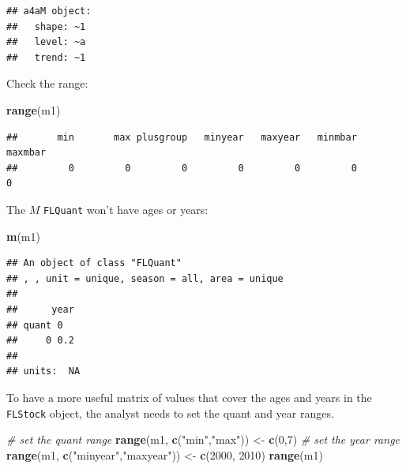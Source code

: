 \documentclass[
]{book}
\newenvironment{Shaded}{\begin{snugshade}}{\end{snugshade}}
\newcommand{\CommentTok}[1]{\textcolor[rgb]{0.56,0.35,0.01}{\textit{#1}}}
\newcommand{\DecValTok}[1]{\textcolor[rgb]{0.00,0.00,0.81}{#1}}
\newcommand{\FunctionTok}[1]{\textcolor[rgb]{0.13,0.29,0.53}{\textbf{#1}}}
\newcommand{\NormalTok}[1]{#1}
\newcommand{\OtherTok}[1]{\textcolor[rgb]{0.56,0.35,0.01}{#1}}
\newcommand{\StringTok}[1]{\textcolor[rgb]{0.31,0.60,0.02}{#1}}
\begin{document}
\begin{verbatim}
## a4aM object:
##   shape: ~1
##   level: ~a
##   trend: ~1
\end{verbatim}

Check the range:

\begin{Shaded}
\begin{Highlighting}[]
\FunctionTok{range}\NormalTok{(m1)}
\end{Highlighting}
\end{Shaded}

\begin{verbatim}
##       min       max plusgroup   minyear   maxyear   minmbar   maxmbar 
##         0         0         0         0         0         0         0
\end{verbatim}

The \(M\) \texttt{FLQuant} won't have ages or years:

\begin{Shaded}
\begin{Highlighting}[]
\FunctionTok{m}\NormalTok{(m1)}
\end{Highlighting}
\end{Shaded}

\begin{verbatim}
## An object of class "FLQuant"
## , , unit = unique, season = all, area = unique
## 
##      year
## quant 0  
##     0 0.2
## 
## units:  NA
\end{verbatim}

To have a more useful matrix of values that cover the ages and years in the \texttt{FLStock} object, the analyst needs to set the quant and year ranges.

\begin{Shaded}
\begin{Highlighting}[]
\CommentTok{\# set the quant range}
\FunctionTok{range}\NormalTok{(m1, }\FunctionTok{c}\NormalTok{(}\StringTok{"min"}\NormalTok{,}\StringTok{"max"}\NormalTok{)) }\OtherTok{\textless{}{-}} \FunctionTok{c}\NormalTok{(}\DecValTok{0}\NormalTok{,}\DecValTok{7}\NormalTok{)}
\CommentTok{\# set the year range}
\FunctionTok{range}\NormalTok{(m1, }\FunctionTok{c}\NormalTok{(}\StringTok{"minyear"}\NormalTok{,}\StringTok{"maxyear"}\NormalTok{)) }\OtherTok{\textless{}{-}} \FunctionTok{c}\NormalTok{(}\DecValTok{2000}\NormalTok{, }\DecValTok{2010}\NormalTok{)}
\FunctionTok{range}\NormalTok{(m1)}
\end{Highlighting}
\end{Shaded}
\end{document}
